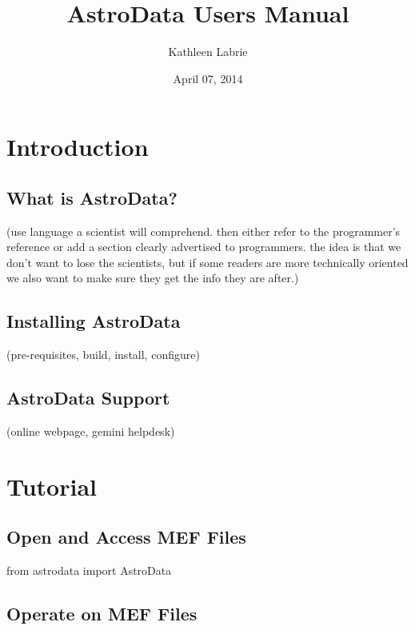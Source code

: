\documentclass[letterpaper,10pt,english]{sphinxmanual}
\title{AstroData Users Manual}
\date{April 07, 2014}
\author{Kathleen Labrie}
\begin{document}
\maketitle
\tableofcontents
{}\label{index-latex::doc}



\chapter{Introduction}
\label{intro:introduction}\label{intro::doc}\label{intro:astrodata-user-s-manual}

\section{What is AstroData?}
\label{intro:what-is-astrodata}
(use language a scientist will comprehend.  then either refer to the programmer's reference
or add a section clearly advertised to programmers.  the idea is that we don't want to lose
the scientists, but if some readers are more technically oriented we also want to make sure
they get the info they are after.)


\section{Installing AstroData}
\label{intro:installing-astrodata}
(pre-requisites, build, install, configure)


\section{AstroData Support}
\label{intro:astrodata-support}
(online webpage, gemini helpdesk)


\chapter{Tutorial}
\label{tutorial::doc}\label{tutorial:tutorial}

\section{Open and Access MEF Files}
\label{tutorial:open-and-access-mef-files}
from astrodata import AstroData


\section{Operate on MEF Files}
\label{tutorial:operate-on-mef-files}
\end{document}
